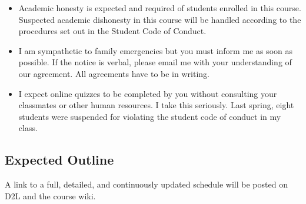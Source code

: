 \documentclass[letterpaper,10pt]{article}
\begin{document}
\begin{itemize}
\item Academic honesty is expected and required of students enrolled
  in this course.  Suspected academic dishonesty in this course will
  be handled according to the procedures set out in the Student Code
  of Conduct.

\item I am sympathetic to family emergencies but you must inform me as
  soon as possible. If the notice is verbal, please email me with your
  understanding of our agreement. All agreements have to be in
  writing.

\item I expect online quizzes to be completed by you without consulting your classmates or other human resources.  I take this seriously.  Last spring, eight students were suspended for violating the student code of conduct in my class.

\end{itemize}


\subsection{Expected Outline}
A link to a full, detailed, and continuously updated schedule will be
posted on D2L and the course wiki.
\end{document}
